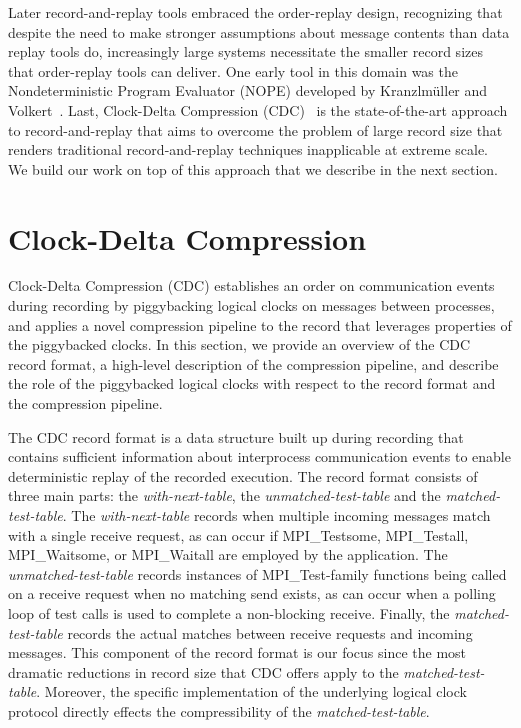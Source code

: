 Later record-and-replay tools embraced the order-replay design,
recognizing that despite the need to make stronger assumptions about
message contents than data replay tools do, increasingly large systems
necessitate the smaller record sizes that order-replay tools can
deliver.  One early tool in this domain was the Nondeterministic
Program Evaluator (NOPE) developed by Kranzlm\"uller and
Volkert~\cite{NOPE:Kranzlmuller:1999}. Last, Clock-Delta Compression
(CDC)~\cite{ClockDeltaCompression:Sato:2015} is the state-of-the-art
approach to record-and-replay that aims to overcome the problem of
large record size that renders traditional record-and-replay
techniques inapplicable at extreme scale. We build our work on top of
this approach that we describe in the next section.

\section{Clock-Delta Compression}

Clock-Delta Compression (CDC) establishes an order on communication
events during recording by piggybacking logical clocks on messages
between processes, and applies a novel compression pipeline to the
record that leverages properties of the piggybacked clocks. In this
section, we provide an overview of the CDC record format, a high-level
description of the compression pipeline, and describe the role of the
piggybacked logical clocks with respect to the record format and the
compression pipeline.

The CDC record format is a data structure built up during recording
that contains sufficient information about interprocess communication
events to enable deterministic replay of the recorded execution. The
record format consists of three main parts: the
\textit{with-next-table}, the \textit{unmatched-test-table} and the
\textit{matched-test-table}. The \textit{with-next-table} records when
multiple incoming messages match with a single receive request, as can
occur if MPI\_Testsome, MPI\_Testall, MPI\_Waitsome, or MPI\_Waitall
are employed by the application.  The \textit{unmatched-test-table}
records instances of MPI\_Test-family functions being called on a
receive request when no matching send exists, as can occur when a
polling loop of test calls is used to complete a non-blocking
receive. Finally, the \textit{matched-test-table} records the actual
matches between receive requests and incoming messages. This component
of the record format is our focus since the most dramatic reductions
in record size that CDC offers apply to the
\textit{matched-test-table}. Moreover, the specific implementation of
the underlying logical clock protocol directly effects the
compressibility of the \textit{matched-test-table}.

